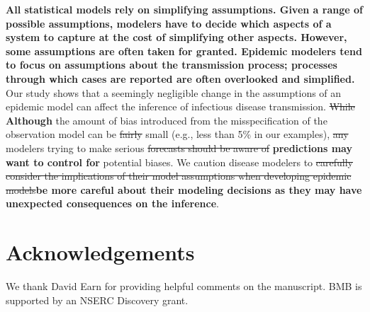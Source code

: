\documentclass[12pt]{article}\usepackage[]{graphicx}\usepackage[]{color}
\providecommand{\DIFaddtex}[1]{{\protect\color{blue}\textbf{#1}}} %
\providecommand{\DIFdeltex}[1]{{\protect\color{red}\sout{#1}}}                      %
\providecommand{\DIFaddbegin}{} %
\providecommand{\DIFaddend}{} %
\providecommand{\DIFdelbegin}{} %
\providecommand{\DIFdelend}{} %
\providecommand{\DIFadd}[1]{\texorpdfstring{\DIFaddtex{#1}}{#1}} %
\providecommand{\DIFdel}[1]{\texorpdfstring{\DIFdeltex{#1}}{}} %
\newcommand{\DIFscaledelfig}{0.5}
\newlength{\DIFdelgraphicswidth} %
\newlength{\DIFdelgraphicsheight} %
\newcommand{\DIFaddincludegraphics}[2][]{{\color{blue}\fbox{\DIFOincludegraphics[#1]{#2}}}} %
\newcommand{\DIFdelincludegraphics}[2][]{%
\sbox{\DIFdelgraphicsbox}{\DIFOincludegraphics[#1]{#2}}%
\settoboxwidth{\DIFdelgraphicswidth}{\DIFdelgraphicsbox} %
\settoboxtotalheight{\DIFdelgraphicsheight}{\DIFdelgraphicsbox} %
\scalebox{\DIFscaledelfig}{%
\parbox[b]{\DIFdelgraphicswidth}{\usebox{\DIFdelgraphicsbox}\\[-\baselineskip] \rule{\DIFdelgraphicswidth}{0em}}\llap{\resizebox{\DIFdelgraphicswidth}{\DIFdelgraphicsheight}{%
\setlength{\unitlength}{\DIFdelgraphicswidth}%
\begin{picture}(1,1)%
\thicklines\linethickness{2pt} %
{\color[rgb]{1,0,0}\put(0,0){\framebox(1,1){}}}%
{\color[rgb]{1,0,0}\put(0,0){\line( 1,1){1}}}%
{\color[rgb]{1,0,0}\put(0,1){\line(1,-1){1}}}%
\end{picture}%
}\hspace*{3pt}}} %
} %
\DeclareRobustCommand{\DIFaddbegin}{\DIFOaddbegin \let\includegraphics\DIFaddincludegraphics} %
\DeclareRobustCommand{\DIFaddend}{\DIFOaddend \let\includegraphics\DIFOincludegraphics} %
\DeclareRobustCommand{\DIFdelbegin}{\DIFOdelbegin \let\includegraphics\DIFdelincludegraphics} %
\DeclareRobustCommand{\DIFdelend}{\DIFOaddend \let\includegraphics\DIFOincludegraphics} %
\begin{document}
\DIFaddbegin \DIFadd{All statistical models rely on simplifying assumptions.
Given a range of possible assumptions, modelers have to
decide which aspects of a system to capture 
at the cost of simplifying other aspects.
However, some assumptions are often taken for granted.
Epidemic modelers tend to focus on assumptions about the
transmission process; processes through which cases are reported are often 
overlooked and simplified.
}\DIFaddend Our study shows that a seemingly negligible change in the assumptions of an epidemic
model can affect the inference of 
infectious disease transmission.
\DIFdelbegin \DIFdel{While }\DIFdelend \DIFaddbegin \DIFadd{Although }\DIFaddend the amount of bias introduced from the misspecification of the observation
model can be \DIFdelbegin \DIFdel{fairly }\DIFdelend small (e.g., less than 5\% in our examples), \DIFdelbegin \DIFdel{any }\DIFdelend modelers
trying to make serious \DIFdelbegin \DIFdel{forecasts should be aware of }\DIFdelend \DIFaddbegin \DIFadd{predictions may want to control for }\DIFaddend potential biases.
We caution disease modelers to \DIFdelbegin \DIFdel{carefully consider the implications of their model assumptions when developing epidemic models}\DIFdelend \DIFaddbegin \DIFadd{be more careful about their modeling decisions as they may have unexpected consequences on the inference}\DIFaddend .

\section*{Acknowledgements}

We thank David Earn for providing helpful comments on the manuscript. BMB is supported by an NSERC Discovery grant.


\end{document}
